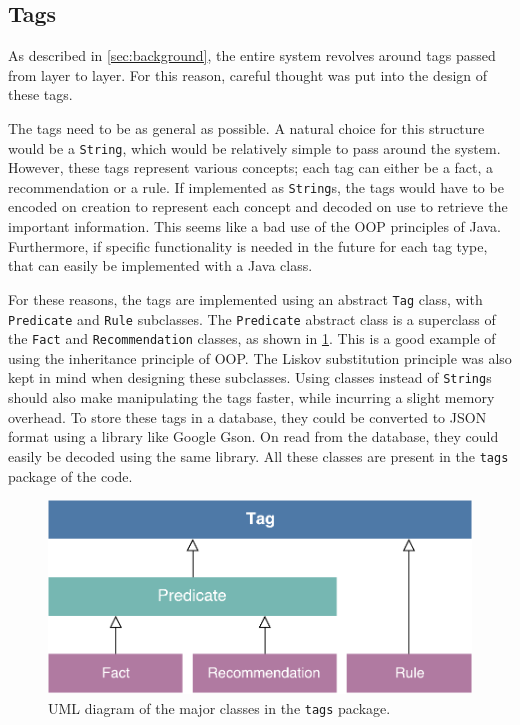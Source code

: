 \documentclass[titlepage,11pt]{article}
\newcommand{\code}[1]{\texttt{#1}}
\begin{document}
\subsection{Tags}
As described in \autoref{sec:background}, the entire system revolves around tags passed from layer to layer. For this reason, careful thought was put into the design of these tags.

The tags need to be as general as possible. A natural choice for this structure would be a \code{String}, which would be relatively simple to pass around the system. However, these tags represent various concepts; each tag can either be a fact, a recommendation or a rule. If implemented as \code{String}s, the tags would have to be encoded on creation to represent each concept and decoded on use to retrieve the important information. This seems like a bad use of the OOP principles of Java. Furthermore, if specific functionality is needed in the future for each tag type, that can easily be implemented with a Java class.

For these reasons, the tags are implemented using an abstract \code{Tag} class, with \code{Predicate} and \code{Rule} subclasses. The \code{Predicate} abstract class is a superclass of the \code{Fact} and \code{Recommendation} classes, as shown in \cref{fig:uml_tags}. This is a good example of using the inheritance principle of OOP. The Liskov substitution principle was also kept in mind when designing these subclasses. Using classes instead of \code{String}s should also make manipulating the tags faster, while incurring a slight memory overhead. To store these tags in a database, they could be converted to JSON format using a library like Google Gson. On read from the database, they could easily be decoded using the same library. All these classes are present in the \code{tags} package of the code.

\begin{figure}[!htb]
	\includegraphics[width=\columnwidth]{figures/uml_tags.pdf}
	\caption{UML diagram of the major classes in the \code{tags} package.}
	\label{fig:uml_tags}
\end{figure}
\end{document}
